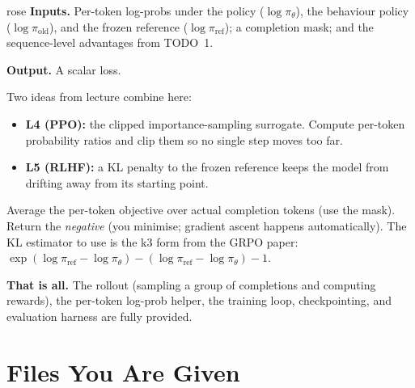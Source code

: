 \documentclass[11pt]{article}
\begin{document}
\begin{qbox}{rose}
\textbf{Inputs.} Per-token log-probs under the policy ($\log\pi_\theta$),
the behaviour policy ($\log\pi_{\text{old}}$), and the frozen reference ($\log\pi_{\text{ref}}$);
a completion mask; and the sequence-level advantages from TODO~1.

\textbf{Output.} A scalar loss.

Two ideas from lecture combine here:
\begin{itemize}[itemsep=1pt]
  \item \textbf{L4 (PPO):} the clipped importance-sampling surrogate.
        Compute per-token probability ratios and clip them so no single step moves too far.
  \item \textbf{L5 (RLHF):} a KL penalty to the frozen reference keeps the model from
        drifting away from its starting point.
\end{itemize}
Average the per-token objective over actual completion tokens (use the mask).
Return the \emph{negative} (you minimise; gradient ascent happens automatically).
The KL estimator to use is the k3 form from the GRPO paper:
$\exp(\log\pi_{\text{ref}} - \log\pi_\theta) - (\log\pi_{\text{ref}} - \log\pi_\theta) - 1$.
\end{qbox}

\textbf{That is all.}
The rollout (sampling a group of completions and computing rewards), the per-token log-prob helper,
the training loop, checkpointing, and evaluation harness are fully provided.

\section{Files You Are Given}
\end{document}
